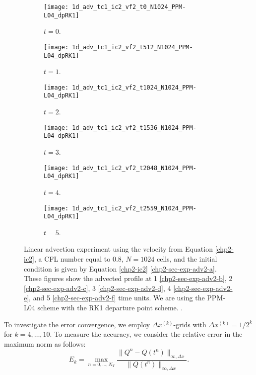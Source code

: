 \begin{figure}[!htb]
	\centering
	\begin{subfigure}{0.3\textwidth}
		\centering
		\texttt{[image: 1d\_adv\_tc1\_ic2\_vf2\_t0\_N1024\_PPM-L04\_dpRK1]}
		\caption{$t=0$.\label{chp2-sec-exp-adv2-a}}
	\end{subfigure}
	\begin{subfigure}{0.3\textwidth}
		\centering
		\texttt{[image: 1d\_adv\_tc1\_ic2\_vf2\_t512\_N1024\_PPM-L04\_dpRK1]}
		\caption{$t=1$.\label{chp2-sec-exp-adv2-b}}
	\end{subfigure}
	\begin{subfigure}{0.3\textwidth}
		\centering
		\texttt{[image: 1d\_adv\_tc1\_ic2\_vf2\_t1024\_N1024\_PPM-L04\_dpRK1]}
		\caption{$t=2$.\label{chp2-sec-exp-adv2-c}}
	\end{subfigure}
	
	\begin{subfigure}{0.3\textwidth}
		\centering
		\texttt{[image: 1d\_adv\_tc1\_ic2\_vf2\_t1536\_N1024\_PPM-L04\_dpRK1]}
		\caption{$t=3$.\label{chp2-sec-exp-adv2-d}}
	\end{subfigure}
	\begin{subfigure}{0.3\textwidth}
		\centering
		\texttt{[image: 1d\_adv\_tc1\_ic2\_vf2\_t2048\_N1024\_PPM-L04\_dpRK1]}
		\caption{$t=4$.\label{chp2-sec-exp-adv2-e}}
	\end{subfigure}
	\begin{subfigure}{0.3\textwidth}
		\centering
		\texttt{[image: 1d\_adv\_tc1\_ic2\_vf2\_t2559\_N1024\_PPM-L04\_dpRK1]}
		\caption{$t=5$.\label{chp2-sec-exp-adv2-f}}
	\end{subfigure}
	\caption{Linear advection experiment using the velocity from Equation \eqref{chp2-ic2},
		a CFL number equal to $0.8$, $N=1024$ cells, and the initial condition is given by 
		Equation \eqref{chp2-ic2} \eqref{chp2-sec-exp-adv2-a}.
		These figures show the advected profile at  1 \eqref{chp2-sec-exp-adv2-b}, 
		2  \eqref{chp2-sec-exp-adv2-c}, 3  \eqref{chp2-sec-exp-adv2-d}, 4  \eqref{chp2-sec-exp-adv2-e},
		and 5  \eqref{chp2-sec-exp-adv2-f} time units.
		We are using the PPM-L04 scheme with the RK1 departure point scheme. .\label{chp2-sec-exp-adv2}}
\end{figure}
To investigate the error convergence, we employ $\Delta x^{(k)}$-grids with $\Delta x^{(k)} = 1/2^k$ for 
$k = 4, \ldots, 10$.
To measure the accuracy, we consider the relative error in the maximum norm as follows:
\begin{equation*}
	E_k = \max_{n=0,\ldots, N_T}
	\frac{\| Q^n - Q(t^n) \|_{\infty, \Delta x}}{\|Q(t^n)\|_{\infty, \Delta x}}.
\end{equation*}
